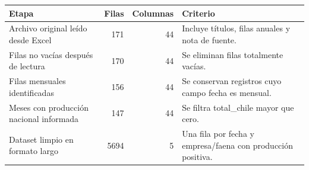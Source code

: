 \begin{tabular}{lrrp{}}
\toprule
Etapa & Filas & Columnas & Criterio \\
\midrule
Archivo original leído desde Excel & 171 & 44 & Incluye títulos, filas anuales y nota de fuente. \\
Filas no vacías después de lectura & 170 & 44 & Se eliminan filas totalmente vacías. \\
Filas mensuales identificadas & 156 & 44 & Se conservan registros cuyo campo fecha es mensual. \\
Meses con producción nacional informada & 147 & 44 & Se filtra total\_chile mayor que cero. \\
Dataset limpio en formato largo & 5694 & 5 & Una fila por fecha y empresa/faena con producción positiva. \\
\bottomrule
\end{tabular}
